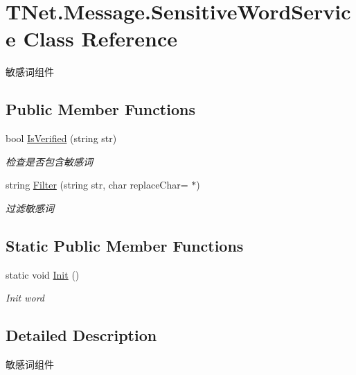 \hypertarget{class_t_net_1_1_message_1_1_sensitive_word_service}{}\section{T\+Net.\+Message.\+Sensitive\+Word\+Service Class Reference}
\label{class_t_net_1_1_message_1_1_sensitive_word_service}


敏感词组件  


\subsection*{Public Member Functions}
\begin{DoxyCompactItemize}
\item 
bool \mbox{\hyperlink{class_t_net_1_1_message_1_1_sensitive_word_service_af93647ecbf4497a34386b84a4d5066e7}{Is\+Verified}} (string str)
\begin{DoxyCompactList}\small\item\em 检查是否包含敏感词 \end{DoxyCompactList}\item 
string \mbox{\hyperlink{class_t_net_1_1_message_1_1_sensitive_word_service_a9b271200938596f275f42fe13479e98a}{Filter}} (string str, char replace\+Char=\textquotesingle{} $\ast$\textquotesingle{})
\begin{DoxyCompactList}\small\item\em 过滤敏感词 \end{DoxyCompactList}\end{DoxyCompactItemize}
\subsection*{Static Public Member Functions}
\begin{DoxyCompactItemize}
\item 
static void \mbox{\hyperlink{class_t_net_1_1_message_1_1_sensitive_word_service_a60fb501f2e7233a0f2010f479c2e589a}{Init}} ()
\begin{DoxyCompactList}\small\item\em Init word \end{DoxyCompactList}\end{DoxyCompactItemize}


\subsection{Detailed Description}
敏感词组件 



